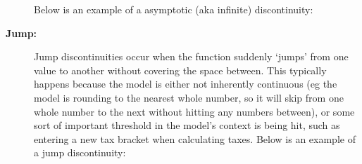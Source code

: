 \documentclass{ximera}
\begin{document}
\begin{description}
{                }
        Below is an example of a asymptotic (aka infinite) discontinuity:
        \begin{center}
            \end{center}
                    
        \item[\textbf{Jump:}] Jump discontinuities occur when the function suddenly `jumps' from one value to another without covering the space between. This typically happens because the model is either not inherently continuous (eg the model is rounding to the nearest whole number, so it will skip from one whole number to the next without hitting any numbers between), or some sort of important threshold in the model's context is being hit, such as entering a new tax bracket when calculating taxes. Below is an example of a jump discontinuity:
        \begin{center}
            \end{center}
    \end{description}
\end{document}
